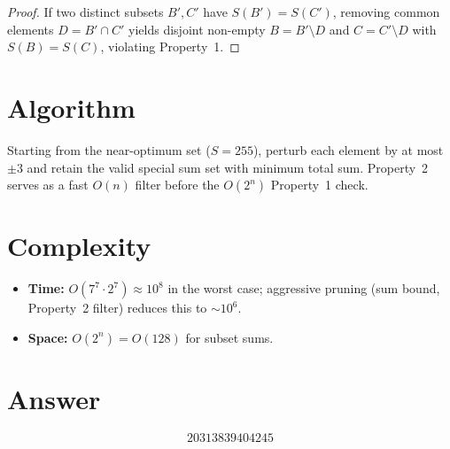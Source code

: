 \documentclass[12pt]{article}
\begin{document}
\begin{proof}
If two distinct subsets $B', C'$ have $S(B') = S(C')$, removing common elements $D = B' \cap C'$ yields disjoint non-empty $B = B' \setminus D$ and $C = C' \setminus D$ with $S(B) = S(C)$, violating Property~1.
\end{proof}

\section{Algorithm}

Starting from the near-optimum set ($S = 255$), perturb each element by at most $\pm 3$ and retain the valid special sum set with minimum total sum. Property~2 serves as a fast $O(n)$ filter before the $O(2^n)$ Property~1 check.

\section{Complexity}

\begin{itemize}
\item \textbf{Time:} $O(7^7 \cdot 2^7) \approx 10^8$ in the worst case; aggressive pruning (sum bound, Property~2 filter) reduces this to $\sim 10^6$.
\item \textbf{Space:} $O(2^n) = O(128)$ for subset sums.
\end{itemize}

\section{Answer}

\[
\boxed{20313839404245}
\]
\end{document}
